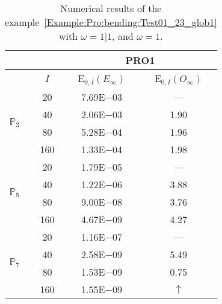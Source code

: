 \begin{table}[H]
\caption{Numerical results of the example~\ref{Example:Pro:bending:Test01_23_glob1} with $\omega=1|1$, and $\omega=1$.}
\setlength{\tabcolsep}{5pt}
\centering
\begin{tabular}{@{}l c c c@{}}
\toprule
 &  & \multicolumn{2}{c}{PRO1}\\
\midrule
 & $I$ & E$_{0,I}(E_{\infty})$ & E$_{0,I}(O_{\infty})$\\
\midrule
\multirow{4}{*}{$\mathbb{P}_{3}$} & 20 & 7.69E$-$03 & ---\\
 & 40 & 2.06E$-$03 & 1.90\\
 & 80 & 5.28E$-$04 & 1.96\\
 & 160 & 1.33E$-$04 & 1.98\\
\midrule
\multirow{4}{*}{$\mathbb{P}_{5}$} & 20 & 1.79E$-$05 & ---\\
 & 40 & 1.22E$-$06 & 3.88\\
 & 80 & 9.00E$-$08 & 3.76\\
 & 160 & 4.67E$-$09 & 4.27\\
\midrule
\multirow{4}{*}{$\mathbb{P}_{7}$} & 20 & 1.16E$-$07 & ---\\
 & 40 & 2.58E$-$09 & 5.49\\
 & 80 & 1.53E$-$09 & 0.75\\
 & 160 & 1.55E$-$09 & $\uparrow$\\
\bottomrule
\end{tabular}
\label{Table:PRO:test_01_23_test1}
\end{table}
